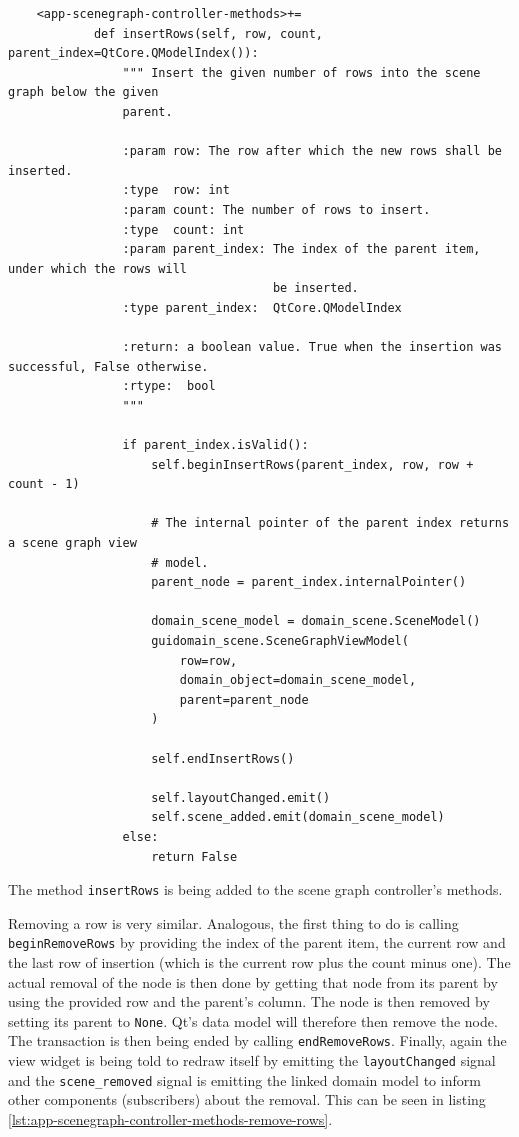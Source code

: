 \documentclass[10pt, openright, notitlepage]{scrreprt}
\begin{document}
\begin{listing}[H]
\begin{verbatim}
    <app-scenegraph-controller-methods>+=
            def insertRows(self, row, count, parent_index=QtCore.QModelIndex()):
                """ Insert the given number of rows into the scene graph below the given
                parent.
            
                :param row: The row after which the new rows shall be inserted.
                :type  row: int
                :param count: The number of rows to insert.
                :type  count: int
                :param parent_index: The index of the parent item, under which the rows will
                                     be inserted.
                :type parent_index:  QtCore.QModelIndex
            
                :return: a boolean value. True when the insertion was successful, False otherwise.
                :rtype:  bool
                """
            
                if parent_index.isValid():
                    self.beginInsertRows(parent_index, row, row + count - 1)
            
                    # The internal pointer of the parent index returns a scene graph view
                    # model.
                    parent_node = parent_index.internalPointer()
            
                    domain_scene_model = domain_scene.SceneModel()
                    guidomain_scene.SceneGraphViewModel(
                        row=row,
                        domain_object=domain_scene_model,
                        parent=parent_node
                    )
            
                    self.endInsertRows()
            
                    self.layoutChanged.emit()
                    self.scene_added.emit(domain_scene_model)
                else:
                    return False
\end{verbatim}
\caption{\label{lst:app-scenegraph-controller-methods-insert-rows}
The method \texttt{insertRows} is being added to the scene graph controller's methods.}
\end{listing}

Removing a row is very similar. Analogous, the first thing to do is calling
\texttt{beginRemoveRows} by providing the index of the parent item, the
current row and the last row of insertion (which is the current row plus the
count minus one).
The actual removal of the node is then done by getting that node from its parent
by using the provided row and the parent's column. The node is then removed by
setting its parent to \texttt{None}. Qt's data model will therefore then remove the
node. The transaction is then being ended by calling \texttt{endRemoveRows}.
Finally, again the view widget is being told to redraw itself by emitting the
\texttt{layoutChanged} signal and the \texttt{scene\_removed} signal is
emitting the linked domain model to inform other components (subscribers) about
the removal. This can be seen in listing
\ref{lst:app-scenegraph-controller-methods-remove-rows}.
\end{document}
